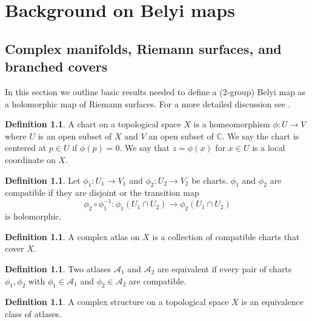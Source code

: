 \documentclass{dcthesis}
\newcommand{\CC}{\mathbb C}
\newcommand{\defi}[1]{\textsf{#1}}
\theoremstyle{definition}
\newtheorem{definition}[prop]{Definition}
\theoremstyle{remark}
\numberwithin{equation}{section}
\numberwithin{figure}{section}
\begin{document}
\chapter{Background on Belyi maps}{\label{chapter:backgroundbelyimaps}
  \section{Complex manifolds, Riemann surfaces, and branched covers}{\label{sec:riemannsurfaces}
    In this section we outline
    basic results needed to define a ($2$-group) Belyi map
    as a holomorphic map of Riemann surfaces.
    For a more detailed discussion
    see \cite{miranda, farkas}.
    \begin{definition}
      \label{def:chart}
      A \defi{chart} on a topological space $X$
      is a homeomorphism
      $\phi\colon U\to V$
      where $U$ is an open subset of $X$
      and $V$ an open subset of $\CC$.
      We say the chart is \defi{centered}
      at $p\in U$
      if $\phi(p) = 0$.
      We say that $z = \phi(x)$ for $x\in U$
      is a \defi{local coordinate on $X$}.
    \end{definition}
    \begin{definition}
      \label{def:compatible}
      Let $\phi_1\colon U_1\to V_1$
      and $\phi_2\colon U_2\to V_2$
      be charts.
      $\phi_1$ and $\phi_2$ are
      \defi{compatible}
      if they are disjoint or
      the \defi{transition map}
      \[
        \phi_2\circ\phi_1^{-1}\colon
        \phi_1(U_1\cap U_2)\to
        \phi_2(U_1\cap U_2)
      \]
      is holomorphic.
    \end{definition}
    \begin{definition}
      \label{def:atlas}
      A \defi{complex atlas}
      on $X$ is a collection of compatible
      charts that cover $X$.
    \end{definition}
    \begin{definition}
      \label{def:equivatlas}
      Two atlases $\mathscr{A}_1$ and $\mathscr{A}_2$
      are \defi{equivalent}
      if every pair of charts
      $\phi_1, \phi_2$
      with
      $\phi_1\in\mathscr{A}_1$
      and
      $\phi_2\in\mathscr{A}_2$
      are compatible.
    \end{definition}
    \begin{definition}
      \label{def:complexstructure}
      A \defi{complex structure}
      on a topological space $X$
      is an equivalence class of atlases.
    \end{definition}
}}
\end{document}
